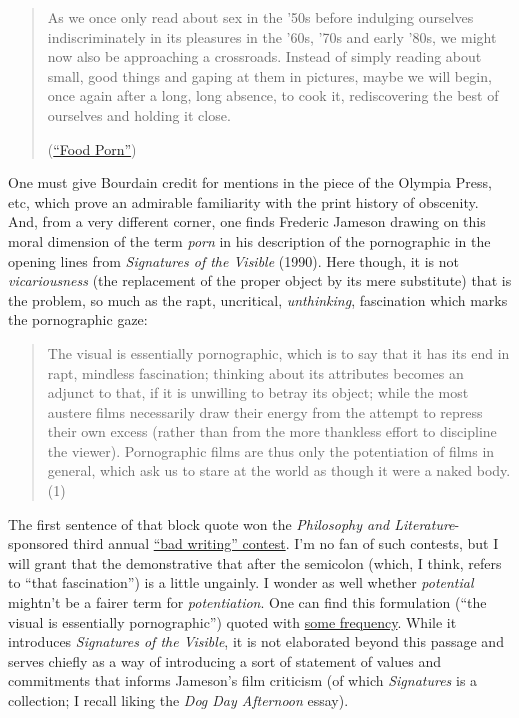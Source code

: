 \documentclass[
  12pt,
]{article}
\begin{document}
\begin{quote}
As we once only read about sex in the '50s before indulging ourselves
indiscriminately in its pleasures in the '60s, '70s and early '80s, we
might now also be approaching a crossroads. Instead of simply reading
about small, good things and gaping at them in pictures, maybe we will
begin, once again after a long, long absence, to cook it, rediscovering
the best of ourselves and holding it close.

(\href{http://www.sfgate.com/books/article/ESSAY-FOOD-PORN-Lust-for-the-2862233.php\#ixzz2VFb3TzEM}{``Food
Porn''})
\end{quote}

{One must give Bourdain credit for mentions in the piece of the Olympia
Press, etc, which prove an admirable familiarity with the print history
of obscenity.} And, from a very different corner, one finds Frederic
Jameson drawing on this moral dimension of the term \emph{porn} in his
description of the pornographic in the opening lines from
\emph{Signatures of the Visible} (1990). Here though, it is not
\emph{vicariousness} (the replacement of the proper object by its mere
substitute) that is the problem, so much as the rapt, uncritical,
\emph{unthinking}, fascination which marks the pornographic gaze:

\begin{quote}
The visual is essentially pornographic, which is to say that it has its
end in rapt, mindless fascination; thinking about its attributes becomes
an adjunct to that, if it is unwilling to betray its object; while the
most austere films necessarily draw their energy from the attempt to
repress their own excess (rather than from the more thankless effort to
discipline the viewer). Pornographic films are thus only the
potentiation of films in general, which ask us to stare at the world as
though it were a naked body. (1)
\end{quote}

{The first sentence of that block quote won the \emph{Philosophy and
Literature}-sponsored third annual
\href{http://profron.net/fun/BadWriting.html}{``bad writing'' contest}.
I'm no fan of such contests, but I will grant that the demonstrative
that after the semicolon (which, I think, refers to ``that
fascination'') is a little ungainly. I wonder as well whether
\emph{potential} mightn't be a fairer term for \emph{potentiation}.} One
can find this formulation (``the visual is essentially pornographic'')
quoted with
\href{https://www.google.com/search?q=\%22visual+is+essentially+pornographic\%22\&btnG=Search+Books\&tbm=bks\&tbo=1}{some
frequency}. While it introduces \emph{Signatures of the Visible}, it is
not elaborated beyond this passage and serves chiefly as a way of
introducing a sort of statement of values and commitments that informs
Jameson's film criticism (of which \emph{Signatures} is a collection; I
recall liking the \emph{Dog Day Afternoon} essay).
\end{document}
